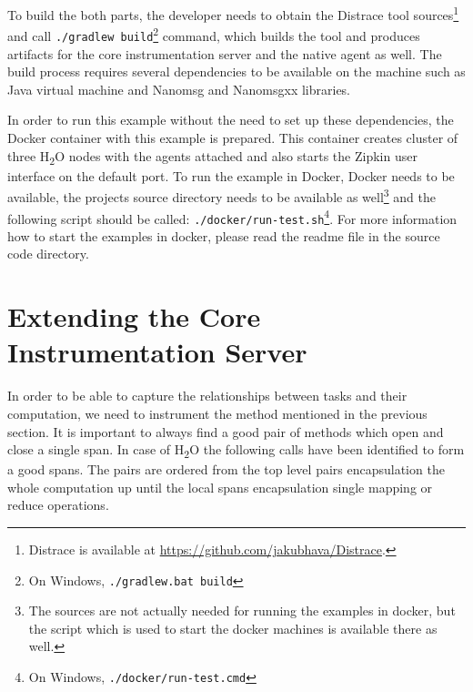 To build the both parts, the developer needs to obtain the Distrace tool sources\footnote{Distrace is available at \url{https://github.com/jakubhava/Distrace}.} and call \texttt{./gradlew build}\footnote{On Windows, \texttt{./gradlew.bat build}} command, which builds the tool and produces artifacts for the core instrumentation server and the native agent as well. The build process requires several dependencies to be available on the machine such as Java virtual machine and Nanomsg and Nanomsgxx libraries.

In order to run this example without the need to set up these dependencies, the Docker container with this example is prepared. This container creates cluster of three H\textsubscript{2}O nodes with the agents attached and also starts the Zipkin user interface on the default port. To run the example in Docker, Docker needs to be available, the projects source directory needs to be available as well\footnote{The sources are not actually needed for running the examples in docker, but the script which is used to start the docker machines is available there as well.} and the following script should be called: \texttt{./docker/run-test.sh}\footnote{On Windows, \texttt{./docker/run-test.cmd}}. For more information how to start the examples in docker, please read the readme file in the source code directory.

\section{Extending the Core Instrumentation Server}
In order to be able to capture the relationships between tasks and their computation, we need to instrument the method mentioned in the previous section. It is important to always find a good pair of methods which open and close a single span. In case of H\textsubscript{2}O the following calls have been identified to form a good spans. The pairs are ordered from the top level pairs encapsulation the whole computation up until the local spans encapsulation single mapping or reduce operations.

